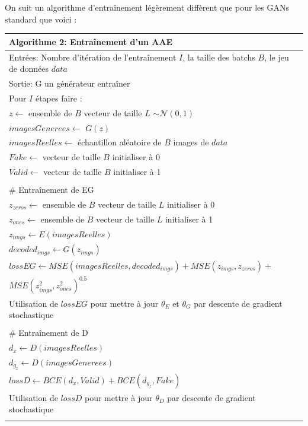 \documentclass[11pt,francais]{article}
\begin{document}
On suit un algorithme d'entraînement légèrement diffèrent que pour les GANs standard que voici :\\
\newpage
\begin{table}[t!]
  \begin{tabular}{l}
  \hline
  Algorithme 2: Entraînement d'un AAE\tabularnewline
  \hline
  Entrées: Nombre d'itération de l'entraînement  \(I\), la taille des batchs \(B\), le jeu de données \(data\)  \tabularnewline
  Sortie: G un générateur entraîner \tabularnewline
  \hline
  Pour \(I\) étapes faire :\tabularnewline 
  \hspace{1cm}\(z \leftarrow\) ensemble de \(B\) vecteur de taille \(L\) \(\sim \mathcal{N}(0,1)\)\tabularnewline
  \hspace{1cm}\(imagesGenerees \leftarrow\) \(G(z)\)\tabularnewline  
  \hspace{1cm}\(imagesReelles \leftarrow\) échantillon aléatoire de \(B\) images de \(data\)\tabularnewline
  \hspace{1cm}\(Fake \leftarrow\) vecteur de taille \(B\) initialiser à 0\tabularnewline
  \hspace{1cm}\(Valid \leftarrow\) vecteur de taille \(B\) initialiser à 1\tabularnewline
  \tabularnewline
  
  \hspace{1cm}\# Entraînement de EG\tabularnewline
  \hspace{1cm}\(z_{zeros} \leftarrow\) ensemble de \(B\) vecteur de taille \(L\) initialiser à 0\tabularnewline
  \hspace{1cm}\(z_{ones} \leftarrow\) ensemble de \(B\) vecteur de taille \(L\) initialiser à 1\tabularnewline
  \hspace{1cm}\(z_{imgs} \leftarrow E(imagesReelles)\)\tabularnewline
  \hspace{1cm}\(decoded_{imgs} \leftarrow G(z_{imgs})\)\tabularnewline
  \hspace{1cm}\(lossEG \leftarrow MSE(imagesReelles, decoded_{imgs}) + MSE(z_{imgs}, z_{zeros}) +\)\tabularnewline
  \hspace{2,8cm}\(MSE(z_{imgs}^2, z_{ones}^2)^{0.5}\)\tabularnewline
  \hspace{1cm}Utilisation de \(lossEG\) pour mettre à jour \(\theta_E\) et \(\theta_G\) par descente de gradient stochastique\tabularnewline
  \tabularnewline
  
  \hspace{1cm}\# Entraînement de D\tabularnewline
  \hspace{1cm}\(d_x \leftarrow D(imagesReelles)\)\tabularnewline
  \hspace{1cm}\(d_{g_z} \leftarrow D(imagesGenerees)\)\tabularnewline
  \hspace{1cm}\(lossD \leftarrow BCE(d_x,Valid) + BCE(d_{g_z},Fake)\)\tabularnewline
  \hspace{1cm}Utilisation de \(lossD\) pour mettre à jour \(\theta_D\) par descente de gradient stochastique\tabularnewline
  \tabularnewline
  

\end{tabular}
\end{table}
\end{document}
